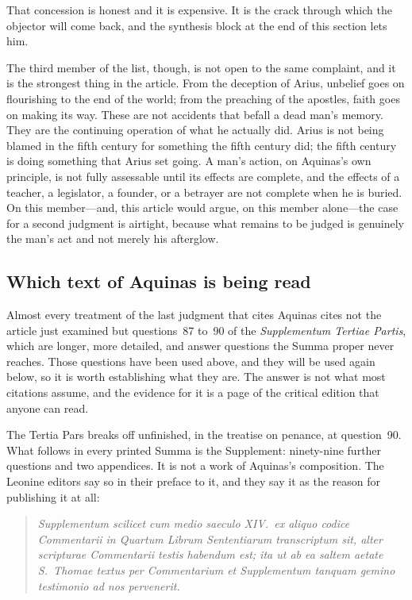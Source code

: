 That concession is honest and it is expensive. It is the crack through which the objector will come back, and the synthesis block at the end of this section lets him.

The third member of the list, though, is not open to the same complaint, and it is the strongest thing in the article. From the deception of Arius, unbelief goes on flourishing to the end of the world; from the preaching of the apostles, faith goes on making its way. These are not accidents that befall a dead man's memory. They are the continuing operation of what he actually did. Arius is not being blamed in the fifth century for something the fifth century did; the fifth century is doing something that Arius set going. A man's action, on Aquinas's own principle, is not fully assessable until its effects are complete, and the effects of a teacher, a legislator, a founder, or a betrayer are not complete when he is buried. On this member---and, this article would argue, on this member alone---the case for a second judgment is airtight, because what remains to be judged is genuinely the man's act and not merely his afterglow.

\subsection{Which text of Aquinas is being read}

Almost every treatment of the last judgment that cites Aquinas cites not the article just examined but questions~87 to~90 of the \emph{Supplementum Tertiae Partis}, which are longer, more detailed, and answer questions the Summa proper never reaches. Those questions have been used above, and they will be used again below, so it is worth establishing what they are. The answer is not what most citations assume, and the evidence for it is a page of the critical edition that anyone can read.

The Tertia Pars breaks off unfinished, in the treatise on penance, at question~90. What follows in every printed Summa is the Supplement: ninety-nine further questions and two appendices. It is not a work of Aquinas's composition. The Leonine editors say so in their preface to it, and they say it as the reason for publishing it at all:

\begin{quote}
\emph{Supplementum scilicet cum medio saeculo XIV.\ ex aliquo codice Commentarii in Quartum Librum Sententiarum transcriptum sit, alter scripturae Commentarii testis habendum est; ita ut ab ea saltem aetate S.~Thomae textus per Commentarium et Supplementum tanquam gemino testimonio ad nos pervenerit.}
\end{quote}


